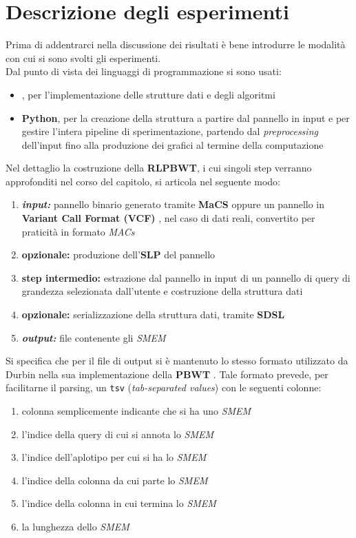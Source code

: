 \section{Descrizione degli esperimenti}
Prima di addentrarci nella discussione dei risultati è bene introdurre le
modalità con cui si sono svolti gli esperimenti.\\
Dal punto di vista dei linguaggi di programmazione si sono usati:
\begin{itemize}
  \item \textbf{\Cplusplus}, per l'implementazione delle strutture dati e degli
  algoritmi
  \item \textbf{Python}, per la creazione della struttura a partire dal
  pannello in input e per gestire l'intera pipeline di sperimentazione,
  partendo dal \textit{preprocessing} dell'input fino alla produzione dei
  grafici al termine della computazione
\end{itemize}
Nel dettaglio la costruzione della \textbf{RLPBWT}, i cui
singoli step verranno approfonditi nel corso del capitolo, si articola nel
seguente modo: 
\begin{enumerate}
  \item \textit{\textbf{input:}} pannello binario generato tramite
  \textbf{MaCS} oppure un pannello in \textbf{Variant Call Format (VCF)}
  \cite{vcf}, nel 
  caso di dati reali, convertito per praticità in formato \textit{MACs}
  \item \textbf{opzionale:} produzione dell'\textbf{SLP} del pannello
  \item \textbf{step intermedio:} estrazione dal pannello in input di un
  pannello di query di grandezza selezionata dall'utente e costruzione della
  struttura dati  
  \item \textbf{opzionale:} serializzazione della struttura dati, tramite
  \textbf{SDSL} 
  \item \textit{\textbf{output:}} file contenente gli \textit{SMEM}
\end{enumerate}
Si specifica che per il file di output si è mantenuto lo stesso formato
utilizzato da Durbin nella sua implementazione della \textbf{PBWT}
\cite{durbin_gh}. Tale formato prevede, per facilitarne il parsing, un
\texttt{tsv} (\textit{tab-separated values}) con le seguenti colonne:
\begin{enumerate}
  \item colonna semplicemente indicante che si ha uno \textit{SMEM}
  \item l'indice della query di cui si annota lo \textit{SMEM}
  \item l'indice dell'aplotipo per cui si ha lo \textit{SMEM}
  \item l'indice della colonna da cui parte lo \textit{SMEM}
  \item l'indice della colonna in cui termina lo \textit{SMEM}
  \item la lunghezza dello \textit{SMEM}
\end{enumerate}
